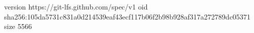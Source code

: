 version https://git-lfs.github.com/spec/v1
oid sha256:105da5731c831a0d214539eaf43ecf117b06f2b98b928af317a272789dc05371
size 5566
